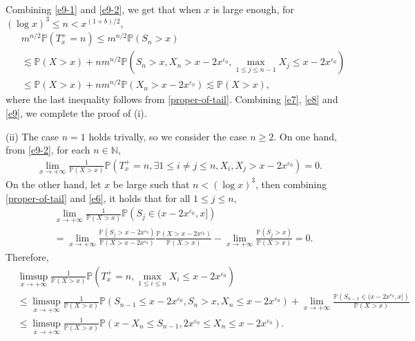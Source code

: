 \documentclass[10pt,a4paper]{amsart}
\numberwithin{equation}{section}
\begin{document}
Combining \eqref{e9-1} and \eqref{e9-2}, we get that when $x$ is large enough, for $(\log x)^3\leq n< x^{(1+b)/2}$,
\begin{align}\label{e9}
	& m^{n/2}\mathbb{P}(T_x^+=n) \leq m^{n/2} \mathbb{P}(S_n>x) \nonumber\\
	&\lesssim   \mathbb{P}(X>x)   + n m^{n/2} \mathbb{P}\left(S_n>x, X_n>x-2x^{\varepsilon_0}, \max_{1\leq j\leq n-1} X_j\leq x-2x^{\varepsilon_0}\right) \nonumber\\
	&\leq    \mathbb{P}(X>x)  + n m^{n/2} \mathbb{P}\left( X_n>x-2x^{\varepsilon_0} \right) \lesssim   \mathbb{P}(X>x)  ,
\end{align}
where the last inequality follows from \eqref{proper-of-tail}.  Combining \eqref{e7}, \eqref{e8} and \eqref{e9}, we complete the proof of (i).

(ii) The case $n=1$ holds trivally, so we consider the case $n\geq 2$. On one hand, from \eqref{e9-2},   for each $n\in \mathbb{N}$,
\begin{align}\label{e11-1}
	\lim_{x\to+\infty} \frac{1}{\mathbb{P}(X>x)}\mathbb{P}\left(T_x^+=n, \exists 1\leq  i\neq j\leq n, X_i, X_j > x-2x^{\varepsilon_0} \right) =0. 
\end{align}
On the other hand, let $x$ be large such that $n< (\log x)^3$, then combining \eqref{proper-of-tail} and \eqref{e6},  it holds that for all $1\leq j\leq n$,
\begin{align}
 	& \lim_{x\to+\infty} \frac{1}{\mathbb{P}(X>x)} \mathbb{P}\left(S_j\in (x-2x^{\varepsilon_0}, x] \right) \nonumber\\
 	&= \lim_{x\to+\infty} \frac{\mathbb{P}\left(S_j> x-2x^{\varepsilon_0} \right)}{\mathbb{P}(X>x-2x^{\varepsilon_0})} \frac{\mathbb{P}\left(X> x-2x^{\varepsilon_0} \right)}{\mathbb{P}(X>x)} -\lim_{x\to+\infty} \frac{\mathbb{P}\left(S_j>x \right)}{\mathbb{P}(X>x)} =0.
\end{align}
Therefore,
\begin{align}
	& \limsup_{x\to+\infty} \frac{1}{\mathbb{P}(X>x)}\mathbb{P}\left(T_x^+=n, \max_{1\leq i\leq n} X_i \leq x-2x^{\varepsilon_0}\right) \nonumber\\
	& \leq  \limsup_{x\to+\infty} \frac{1}{\mathbb{P}(X>x)} \mathbb{P}\left(S_{n-1} \leq x-2x^{\varepsilon_0}, S_n> x,  X_n \leq x-2x^{\varepsilon_0}\right) + \lim_{x\to+\infty} \frac{\mathbb{P}\left(S_{n-1}\in (x-2x^{\varepsilon_0}, x] \right)}{\mathbb{P}(X>x)} \nonumber\\
	& \leq \limsup_{x\to+\infty} \frac{1}{\mathbb{P}(X>x)}\mathbb{P}\left(x-X_n\leq  S_{n-1},  2x^{\varepsilon_0}\leq X_n \leq x-2x^{\varepsilon_0}\right).
\end{align}
\end{document}
